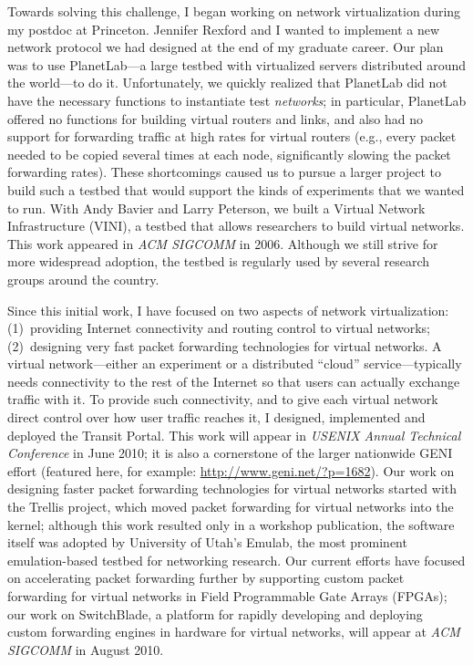 Towards solving this challenge, I began working on network
virtualization during my postdoc at Princeton.  Jennifer Rexford and I
wanted to implement a new network protocol we had designed at the end of
my graduate career. Our plan was to use PlanetLab---a large testbed with
virtualized servers distributed around the world---to do it.
Unfortunately, we quickly realized that PlanetLab did not have the
necessary functions to instantiate test {\em networks}; in particular,
PlanetLab offered no functions for building virtual routers and links,
and also had no support for forwarding traffic at high rates for virtual
routers (e.g., every packet needed to be copied several times at each
node, significantly slowing the packet forwarding rates).  These
shortcomings caused us to pursue a larger project to build such a
testbed that would support the kinds of experiments that we wanted to
run.  With Andy Bavier and Larry Peterson, we built a Virtual Network
Infrastructure (VINI), a testbed that allows researchers to build
virtual networks.  This work appeared in {\em ACM SIGCOMM} in 2006.
Although we still strive for more widespread adoption, the testbed is
regularly used by several research groups around the country.

Since this initial work, I have focused on two aspects of network
virtualization: (1)~providing Internet connectivity and routing control
to virtual networks; (2)~designing very fast packet forwarding
technologies for virtual networks.  A virtual network---either an
experiment or a distributed ``cloud'' service---typically needs
connectivity to the rest of the Internet so that users can actually
exchange traffic with it.  To provide such connectivity, and to give
each virtual network direct control over how user traffic reaches it, I
designed, implemented and deployed the Transit Portal.  This work will
appear in {\em USENIX Annual Technical Conference} in June 2010; it is
also a cornerstone of the larger nationwide GENI effort (featured here,
for example: \url{http://www.geni.net/?p=1682}).  Our work on designing
faster packet forwarding technologies for virtual networks started with
the Trellis project, which moved packet forwarding for virtual networks
into the kernel; although this work resulted only in a workshop
publication, the software itself was adopted by University of Utah's
Emulab, the most prominent emulation-based testbed for networking
research.  Our current efforts have focused on accelerating packet
forwarding further by supporting custom packet forwarding for virtual
networks in Field Programmable Gate Arrays (FPGAs); our work on
SwitchBlade, a platform for rapidly developing and deploying custom
forwarding engines in hardware for virtual networks, will appear at {\em
ACM SIGCOMM} in August 2010.

